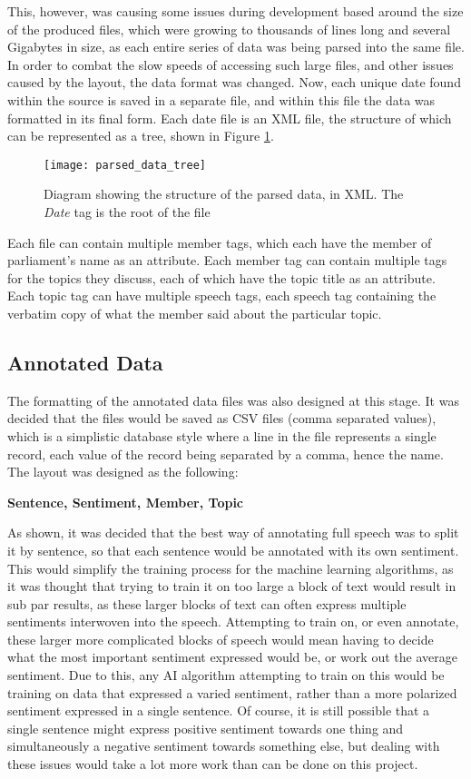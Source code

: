This, however, was causing some issues during development based around the size of the produced files, which were growing to thousands of lines long and several Gigabytes in size, as each entire series of data was being parsed into the same file. In order to combat the slow speeds of accessing such large files, and other issues caused by the layout, the data format was changed. Now, each unique date found within the source is saved in a separate file, and within this file the data was formatted in its final form.
Each date file is an XML file, the structure of which can be represented as a tree, shown in Figure \ref{fig:parsed_data_tree}.

\begin{figure}[ht]
	\texttt{[image: parsed\_data\_tree]}
	\caption{Diagram showing the structure of the parsed data, in XML. The \emph{Date} tag is the root of the file}
	\label{fig:parsed_data_tree}
\end{figure}

Each file can contain multiple member tags, which each have the member of parliament’s name as an attribute. Each member tag can contain multiple tags for the topics they discuss, each of which have the topic title as an attribute. Each topic tag can have multiple speech tags, each speech tag containing the verbatim copy of what the member said about the particular topic.

\subsection{Annotated Data}
\label{sec:des_anotate_data}
The formatting of the annotated data files was also designed at this stage. It was decided that the files would be saved as CSV files (comma separated values), which is a simplistic database style where a line in the file represents a single record, each value of the record being separated by a comma, hence the name. The layout was designed as the following:

\textbf{Sentence, Sentiment, Member, Topic}

As shown, it was decided that the best way of annotating full speech was to split it by sentence, so that each sentence would be annotated with its own sentiment. This would simplify the training process for the machine learning algorithms, as it was thought that trying to train it on too large a block of text would result in sub par results, as these larger blocks of text can often express multiple sentiments interwoven into the speech. Attempting to train on, or even annotate, these larger more complicated blocks of speech would mean having to decide what the most important sentiment expressed would be, or work out the average sentiment. Due to this, any AI algorithm attempting to train on this would be training on data that expressed a varied sentiment, rather than a more polarized sentiment expressed in a single sentence. Of course, it is still possible that a single sentence might express positive sentiment towards one thing and simultaneously a negative sentiment towards something else, but dealing with these issues would take a lot more work than can be done on this project. 

